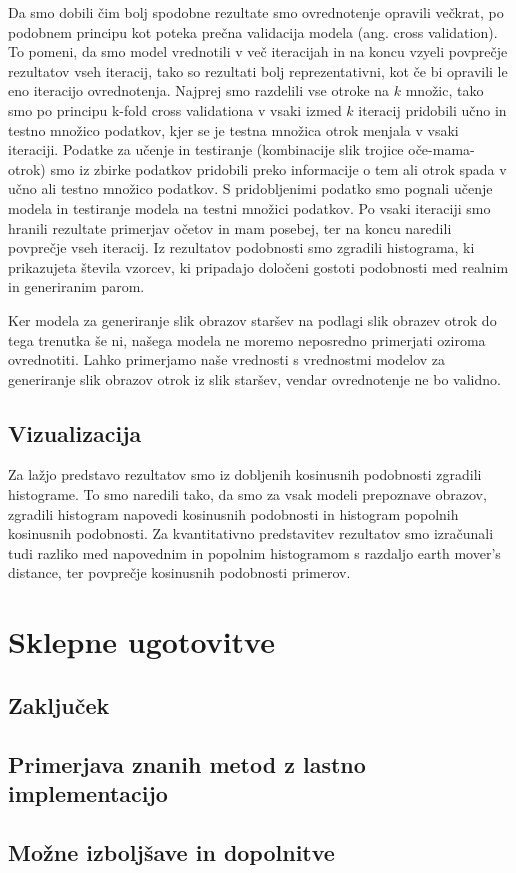\documentclass[a4paper,12pt,openright]{book}
\begin{document}
Da smo dobili čim bolj spodobne rezultate smo ovrednotenje opravili večkrat, po podobnem principu kot poteka prečna validacija modela (ang. cross validation). To pomeni, da smo model vrednotili v več iteracijah in na koncu vzyeli povprečje rezultatov vseh iteracij, tako so rezultati bolj reprezentativni, kot če bi opravili le eno iteracijo ovrednotenja. Najprej smo razdelili vse otroke na $k$ množic, tako smo po principu k-fold cross validationa v vsaki izmed $k$ iteracij pridobili učno in testno množico podatkov, kjer se je testna množica otrok menjala v vsaki iteraciji. Podatke za učenje in testiranje (kombinacije slik trojice oče-mama-otrok) smo iz zbirke podatkov pridobili preko informacije o tem ali otrok spada v učno ali testno množico podatkov. S pridobljenimi podatko smo pognali učenje modela in testiranje modela na testni množici podatkov. Po vsaki iteraciji smo hranili rezultate primerjav očetov in mam posebej, ter na koncu naredili povprečje vseh iteracij. Iz rezultatov podobnosti smo zgradili histograma, ki prikazujeta števila vzorcev, ki pripadajo določeni gostoti podobnosti med realnim in generiranim parom.

Ker modela za generiranje slik obrazov staršev na podlagi slik obrazev otrok do tega trenutka še ni, našega modela ne moremo neposredno primerjati oziroma ovrednotiti.
Lahko primerjamo naše vrednosti s vrednostmi modelov za generiranje slik obrazov otrok iz slik staršev, vendar ovrednotenje ne bo validno. 
\section{Vizualizacija}

Za lažjo predstavo rezultatov smo iz dobljenih kosinusnih podobnosti zgradili histograme.
To smo naredili tako, da smo za vsak modeli prepoznave obrazov, zgradili histogram napovedi kosinusnih podobnosti in histogram popolnih kosinusnih podobnosti. 
Za kvantitativno predstavitev rezultatov smo izračunali tudi razliko med napovednim in popolnim histogramom s razdaljo earth mover's distance, ter povprečje kosinusnih podobnosti primerov.

    
\chapter{Sklepne ugotovitve}

\section{Zaključek}
\section{Primerjava znanih metod z lastno implementacijo}
\section{Možne izboljšave in dopolnitve}






\printbibliography[heading=bibintoc,title={Literatura}]
\end{document}
